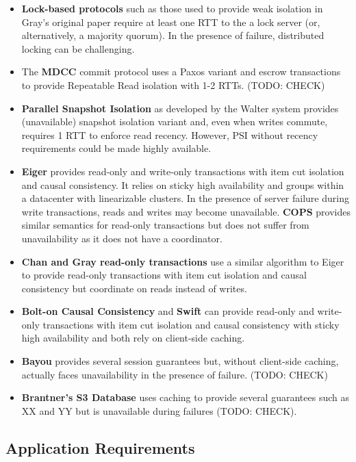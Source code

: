 \begin{itemize}
\item \textbf{Lock-based protocols} such as those used to provide weak
  isolation in Gray's original paper require at least one RTT to the a
  lock server (or, alternatively, a majority quorum). In the presence
  of failure, distributed locking can be challenging.
\item The \textbf{MDCC} commit protocol uses a Paxos variant and escrow
  transactions to provide Repeatable Read isolation with 1-2 RTTs. (TODO: CHECK)
\item \textbf{Parallel Snapshot Isolation} as developed by the Walter
  system provides (unavailable) snapshot isolation variant and, even
  when writes commute, requires 1 RTT to enforce read
  recency. However, PSI without recency requirements could be made
  highly available.
\item \textbf{Eiger} provides read-only and write-only transactions
  with item cut isolation and causal consistency. It relies on sticky
  high availability and groups within a datacenter with linearizable
  clusters. In the presence of server failure during write
  transactions, reads and writes may become unavailable. \textbf{COPS}
  provides similar semantics for read-only transactions but does not
  suffer from unavailability as it does not have a coordinator.
\item \textbf{Chan and Gray read-only transactions} use a similar
  algorithm to Eiger to provide read-only transactions with item cut
  isolation and causal consistency but coordinate on reads instead of
  writes.
\item \textbf{Bolt-on Causal Consistency} and \textbf{Swift} can
  provide read-only and write-only transactions with item cut
  isolation and causal consistency with sticky high availability and
  both rely on client-side caching.
\item \textbf{Bayou} provides several session guarantees but, without
  client-side caching, actually faces unavailability in the presence
  of failure. (TODO: CHECK)
\item \textbf{Brantner's S3 Database} uses caching to provide several
  guarantees such as XX and YY but is unavailable during failures
  (TODO: CHECK).
\end{itemize}

\subsection{Application Requirements}

